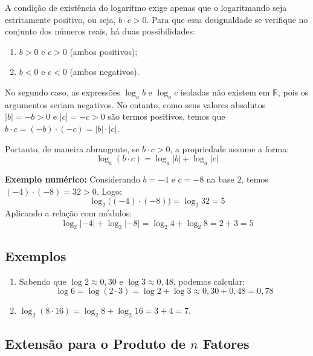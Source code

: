 \documentclass[12pt,a4paper]{report}
\begin{document}
	\newpage
		
	\begin{destaque}
		A condição de existência do logaritmo exige apenas que o logaritmando seja estritamente positivo, ou seja, $b \cdot c > 0$. Para que essa desigualdade se verifique no conjunto dos números reais, há duas possibilidades:
		\begin{enumerate}[label=\alph*)]
			\item $b > 0$ e $c > 0$ (ambos positivos);
			\item $b < 0$ e $c < 0$ (ambos negativos).
		\end{enumerate}
		
		No segundo caso, as expressões $\log_a b$ e $\log_a c$ isoladas não existem em $\mathbb{R}$, pois os argumentos seriam negativos. No entanto, como seus valores absolutos $|b| = -b > 0$ e $|c| = -c > 0$ são termos positivos, temos que $b \cdot c = (-b) \cdot (-c) = |b| \cdot |c|$. 
		
		Portanto, de maneira abrangente, se $b \cdot c > 0$, a propriedade assume a forma:
		$$\log_a (b \cdot c) = \log_a |b| + \log_a |c|$$
		
		\textbf{Exemplo numérico:}  
		Considerando $b = -4$ e $c = -8$ na base $2$, temos $(-4) \cdot (-8) = 32 > 0$. Logo:
		$$\log_2 \bigl((-4) \cdot (-8)\bigr) = \log_2 32 = 5$$
		Aplicando a relação com módulos:
		$$\log_2 |-4| + \log_2 |-8| = \log_2 4 + \log_2 8 = 2 + 3 = 5$$
	\end{destaque}
	
	\subsection*{Exemplos}
	
	\begin{enumerate}[label=\textbf{\alph*)}]
		\item Sabendo que $\log 2 \approx 0{,}30$ e $\log 3 \approx 0{,}48$, podemos calcular:
		$$\log 6 = \log(2 \cdot 3) = \log 2 + \log 3 \approx 0{,}30 + 0{,}48 = 0{,}78$$
		
		\item $\log_2 (8 \cdot 16) = \log_2 8 + \log_2 16 = 3 + 4 = 7$.
	\end{enumerate}
	
	\subsection*{Extensão para o Produto de $n$ Fatores}
	
\end{document}

